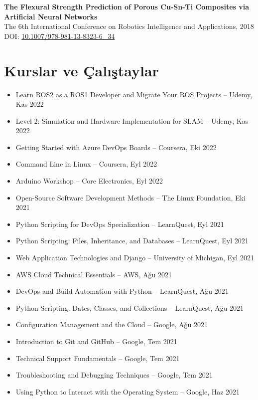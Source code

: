 \documentclass[11pt,a4paper]{article}
\begin{document}
\textbf{The Flexural Strength Prediction of Porous Cu-Sn-Ti Composites via Artificial Neural Networks}\\
The 6th International Conference on Robotics Intelligence and Applications, 2018\\
DOI: \href{https://doi.org/10.1007/978-981-13-8323-6_34}{10.1007/978-981-13-8323-6\_34}

\section*{Kurslar ve Çalıştaylar}

\begin{itemize}
    \item Learn ROS2 as a ROS1 Developer and Migrate Your ROS Projects -- Udemy, Kas 2022
    \item Level 2: Simulation and Hardware Implementation for SLAM -- Udemy, Kas 2022
    \item Getting Started with Azure DevOps Boards -- Coursera, Eki 2022
    \item Command Line in Linux -- Coursera, Eyl 2022
    \item Arduino Workshop -- Core Electronics, Eyl 2022
    \item Open-Source Software Development Methods -- The Linux Foundation, Eki 2021
    \item Python Scripting for DevOps Specialization -- LearnQuest, Eyl 2021
    \item Python Scripting: Files, Inheritance, and Databases -- LearnQuest, Eyl 2021
    \item Web Application Technologies and Django -- University of Michigan, Eyl 2021
    \item AWS Cloud Technical Essentials -- AWS, Ağu 2021
    \item DevOps and Build Automation with Python -- LearnQuest, Ağu 2021
    \item Python Scripting: Dates, Classes, and Collections -- LearnQuest, Ağu 2021
    \item Configuration Management and the Cloud -- Google, Ağu 2021
    \item Introduction to Git and GitHub -- Google, Tem 2021
    \item Technical Support Fundamentals -- Google, Tem 2021
    \item Troubleshooting and Debugging Techniques -- Google, Tem 2021
    \item Using Python to Interact with the Operating System -- Google, Haz 2021

\end{itemize}
\end{document}
